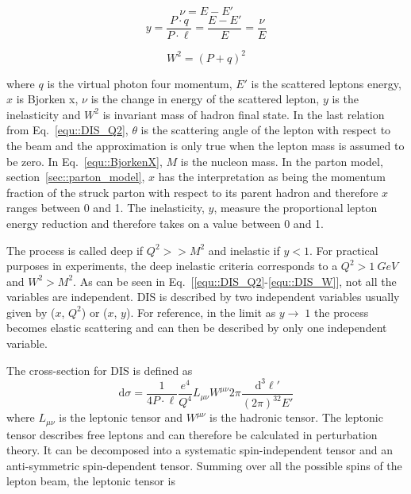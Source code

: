 \begin{multicols}{2}
  \noindent
  \begin{equation}
    \nu = E - E'
  \end{equation} 
  \begin{equation}
    \label{equ::inelasticity}
    y = \frac{P \cdot q}{P \cdot \ell} = \frac{E - E'}{E} = \frac{\nu}{E}
  \end{equation} 
\end{multicols}

\begin{multicols}{2}
  \noindent
  \begin{equation}
    \label{equ::DIS_W}
    W^2 = (P+q)^2
  \end{equation}
\end{multicols}

\noindent
where $q$ is the virtual photon four momentum, $E'$ is the scattered leptons
energy, $x$ is Bjorken x, $\nu$ is the change in energy of the scattered lepton,
$y$ is the inelasticity and $W^2$ is invariant mass of hadron final state.  In
the last relation from Eq.~\ref{equ::DIS_Q2}, $\theta$ is the scattering angle
of the lepton with respect to the beam and the approximation is only true when
the lepton mass is assumed to be zero.  In Eq.~\ref{equ::BjorkenX}, $M$ is the
nucleon mass.  In the parton model, section~\ref{sec::parton_model}, $x$ has the
interpretation as being the momentum fraction of the struck parton with respect
to its parent hadron and therefore $x$ ranges between 0 and 1.  The
inelasticity, $y$, measure the proportional lepton energy reduction and
therefore takes on a value between 0 and 1.

The process is called deep if $Q^2 >> M^2$ and inelastic if $y < 1$.  For
practical purposes in experiments, the deep inelastic criteria corresponds to a
$Q^2 > 1~GeV$ and $W^2 > M^2$.  As can be seen in
Eq.~[\ref{equ::DIS_Q2}-\ref{equ::DIS_W}], not all the variables are independent.
DIS is described by two independent variables usually given by ($x$, $Q^2$) or
($x$, $y$).  For reference, in the limit as $y \to \; 1$ the process becomes
elastic scattering and can then be described by only one independent variable.

The cross-section for DIS is defined as~\cite{Barone:2001sp}
\begin{equation}
  \label{equ::DIS_xsection}
  \mathrm{d}\sigma =
  \frac{1}{4P\cdot \ell}\frac{e^4}{Q^4} L_{\mu\nu}W^{\mu\nu}
  2\pi\frac{\mathrm{d}^3\ell'}{(2\pi)^32E'}
\end{equation}
\noindent
where $L_{\mu\nu}$ is the leptonic tensor and $W^{\mu\nu}$ is the hadronic
tensor.  The leptonic tensor describes free leptons and can therefore be
calculated in perturbation theory.  It can be decomposed into a systematic
spin-independent tensor and an anti-symmetric spin-dependent tensor.  Summing
over all the possible spins of the lepton beam, the leptonic tensor is

